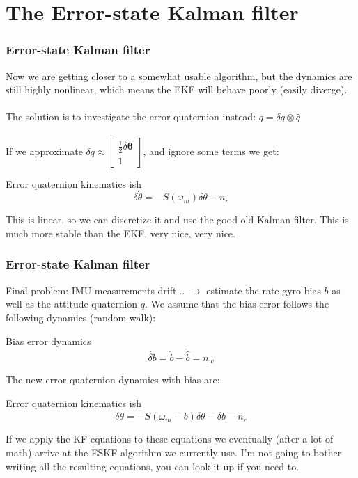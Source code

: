 \documentclass{beamer}
\begin{document}
\section{The Error-state Kalman filter}

\begin{frame}
    \frametitle{Error-state Kalman filter}
    Now we are getting closer to a somewhat usable algorithm, but the dynamics are still highly nonlinear, which means the EKF will behave poorly (easily diverge).\\~\\

    The solution is to investigate the error quaternion instead: $q=\delta q \otimes \hat{q}$\\~\\

    If we approximate $\delta q \approx \left[\begin{array}{c}{\frac{1}{2} \delta \boldsymbol{\theta}} \\ {1}\end{array}\right]$, and ignore some terms we get:
        \begin{block}{Error quaternion kinematics ish}
            \begin{equation}
                \delta \dot{\theta}=-S\left(\omega_{m}\right) \delta \theta-n_r
            \end{equation}
        \end{block}
    This is linear, so we can discretize it and use the good old Kalman filter. This is much more stable than the EKF, very nice, very nice.
\end{frame}


\begin{frame}
    \frametitle{Error-state Kalman filter}
    Final problem: IMU measurements drift... $\rightarrow$ estimate the rate gyro bias $b$ as well as the attitude quaternion $q$. We assume that the bias error follows the following dynamics (random walk):
    \begin{block}{Bias error dynamics}
        \begin{equation}
            \dot{\delta b}=\dot{b}-\dot{\hat{b}}=n_{w}
        \end{equation}
    \end{block}
    The new error quaternion dynamics with bias are:
    \begin{block}{Error quaternion kinematics ish}
        \begin{equation}
            \delta \dot{\theta}=-S\left(\omega_{m}-b\right) \delta \theta-\delta b-n_r
        \end{equation}
    \end{block}
    If we apply the KF equations to these equations we eventually (after a lot of math) arrive at the ESKF algorithm we currently use. I'm not going to bother writing all the resulting equations, you can look it up if you need to.
\end{frame}
\end{document}
